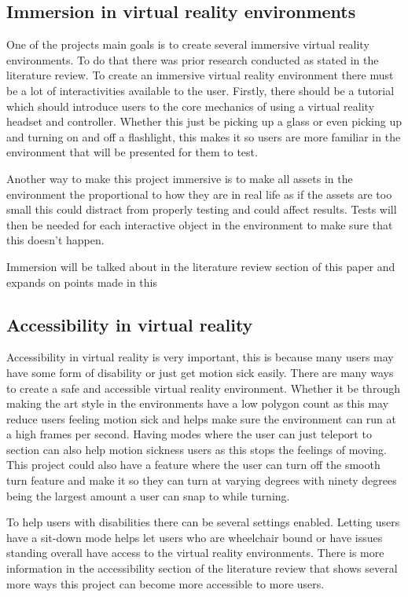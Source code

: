 \subsection{Immersion in virtual reality environments }
One of the projects main goals is to create several immersive virtual reality environments. To do that there was prior research conducted as stated in the literature review. To create an immersive virtual reality environment there must be a lot of interactivities available to the user. Firstly, there should be a tutorial which should introduce users to the core mechanics of using a virtual reality headset and controller. Whether this just be picking up a glass or even picking up and turning on and off a flashlight, this makes it so users are more familiar in the environment that will be presented for them to test. 

Another way to make this project immersive is to make all assets in the environment the proportional to how they are in real life as if the assets are too small this could distract from properly testing and could affect results. Tests will then be needed for each interactive object in the environment to make sure that this doesn’t happen. 

Immersion will be talked about in the literature review section of this paper and expands on points made in this  

\subsection{Accessibility in virtual reality}
Accessibility in virtual reality is very important, this is because many users may have some form of disability or just get motion sick easily. There are many ways to create a safe and accessible virtual reality environment. Whether it be through making the art style in the environments have a low polygon count as this may reduce users feeling motion sick and helps make sure the environment can run at a high frames per second. Having modes where the user can just teleport to section can also help motion sickness users as this stops the feelings of moving. This project could also have a feature where the user can turn off the smooth turn feature and make it so they can turn at varying degrees with ninety degrees being the largest amount a user can snap to while turning. 

To help users with disabilities there can be several settings enabled. Letting users have a sit-down mode helps let users who are wheelchair bound or have issues standing overall have access to the virtual reality environments. There is more information in the accessibility section of the literature review that shows several more ways this project can become more accessible to more users. 

